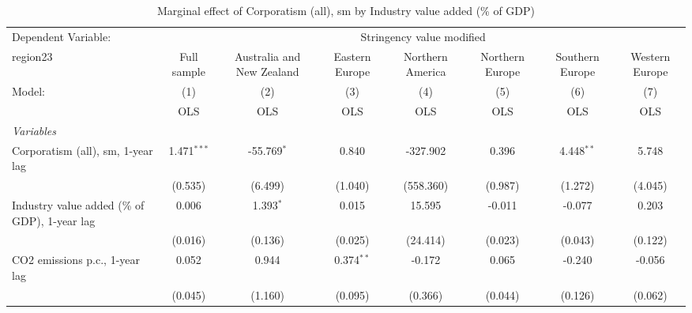 
\begin{table}[htbp]
   \caption{Marginal effect of Corporatism (all), sm by Industry value added (\% of GDP)}
   \centering
   \begin{tabular}{lccccccc}
      \toprule
      Dependent Variable: & \multicolumn{7}{c}{Stringency value modified}\\
      region23                                                                          & Full sample   & Australia and New Zealand & Eastern Europe & Northern America & Northern Europe & Southern Europe & Western Europe \\   
      Model:                                                                            & (1)           & (2)                       & (3)            & (4)              & (5)             & (6)             & (7)\\  
                                                                                        &  OLS          & OLS                       & OLS            & OLS              & OLS             & OLS             & OLS\\  
      \midrule
      \emph{Variables}\\
      Corporatism (all), sm, 1-year lag                                                 & 1.471$^{***}$ & -55.769$^{*}$             & 0.840          & -327.902         & 0.396           & 4.448$^{**}$    & 5.748\\   
                                                                                        & (0.535)       & (6.499)                   & (1.040)        & (558.360)        & (0.987)         & (1.272)         & (4.045)\\   
      Industry value added (\% of GDP), 1-year lag                                      & 0.006         & 1.393$^{*}$               & 0.015          & 15.595           & -0.011          & -0.077          & 0.203\\   
                                                                                        & (0.016)       & (0.136)                   & (0.025)        & (24.414)         & (0.023)         & (0.043)         & (0.122)\\   
      CO2 emissions p.c., 1-year lag                                                    & 0.052         & 0.944                     & 0.374$^{**}$   & -0.172           & 0.065           & -0.240          & -0.056\\   
                                                                                        & (0.045)       & (1.160)                   & (0.095)        & (0.366)          & (0.044)         & (0.126)         & (0.062)\\   

\end{tabular}
\end{table}
